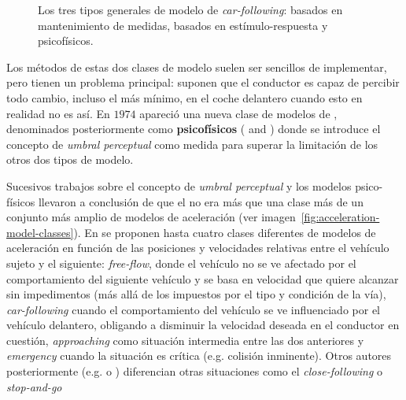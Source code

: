 \begin{figure}
	\caption{Los tres tipos generales de modelo de \textit{car-following}: basados en mantenimiento de medidas, basados en estímulo-respuesta y psicofísicos.}
	\label{fig:car-following-there-different-models}
\end{figure}

Los métodos de estas dos clases de modelo suelen ser sencillos de implementar, pero tienen un problema principal: suponen que el conductor es capaz de percibir todo cambio, incluso el más mínimo, en el coche delantero cuando esto en realidad no es así. En $1974$ apareció una nueva clase de modelos de \textit{}, denominados posteriormente como \textbf{psicofísicos} (\cite{wiedemann1974simulation} and \cite{Leutzbach1988}) donde se introduce el concepto de \textit{umbral perceptual} como medida para superar la limitación de los otros dos tipos de modelo.

Sucesivos trabajos sobre el concepto de \textit{umbral perceptual} y los modelos psico-físicos llevaron a conclusión de que el \textit{} no era más que una clase más de un conjunto más amplio de modelos de aceleración (ver imagen~\ref{fig:acceleration-model-classes}). En \cite{wiedemann1992microscopic} se proponen hasta cuatro clases diferentes de modelos de aceleración en función de las posiciones y velocidades relativas entre el vehículo sujeto y el siguiente: \textit{free-flow}, donde el vehículo no se ve afectado por el comportamiento del siguiente vehículo y se basa en velocidad que quiere alcanzar sin impedimentos (más allá de los impuestos por el tipo y condición de la vía), \textit{car-following} cuando el comportamiento del vehículo se ve influenciado por el vehículo delantero, obligando a disminuir la velocidad deseada en el conductor en cuestión, \textit{approaching} como situación intermedia entre las dos anteriores y \textit{emergency} cuando la situación es crítica (e.g. colisión inminente). Otros autores posteriormente (e.g. \cite{Toledo2003} o \cite{Liu2013}) diferencian otras situaciones como el \textit{close-following} o \textit{stop-and-go}

